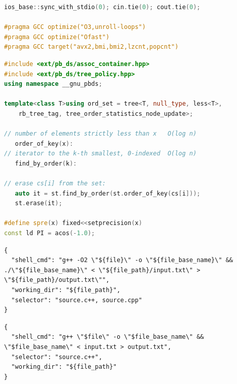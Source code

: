 
\begin{lstlisting}[language=C++]
ios_base::sync_with_stdio(0); cin.tie(0); cout.tie(0);

#pragma GCC optimize("O3,unroll-loops")
#pragma GCC optimize("Ofast")
#pragma GCC target("avx2,bmi,bmi2,lzcnt,popcnt")
\end{lstlisting}

\begin{lstlisting}[language=C++]
#include <ext/pb_ds/assoc_container.hpp>
#include <ext/pb_ds/tree_policy.hpp>
using namespace __gnu_pbds;

template<class T>using ord_set = tree<T, null_type, less<T>,
    rb_tree_tag, tree_order_statistics_node_update>;

// number of elements strictly less than x   O(log n)
   order_of_key(x): 
// iterator to the k-th smallest, 0-indexed  O(log n)
   find_by_order(k): 

// erase cs[i] from the set:
   auto it = st.find_by_order(st.order_of_key(cs[i]));
   st.erase(it);

#define spre(x) fixed<<setprecision(x)
const ld PI = acos(-1.0);
\end{lstlisting}

\begin{lstlisting}
{
  "shell_cmd": "g++ -O2 \"${file}\" -o \"${file_base_name}\" && ./\"${file_base_name}\" < \"${file_path}/input.txt\" > \"${file_path}/output.txt\"",
  "working_dir": "${file_path}",
  "selector": "source.c++, source.cpp"
}
\end{lstlisting}

\begin{lstlisting}
{
  "shell_cmd": "g++ \"$file\" -o \"$file_base_name\" && \"$file_base_name\" < input.txt > output.txt",
  "selector": "source.c++",
  "working_dir": "${file_path}"
}




\end{lstlisting}

